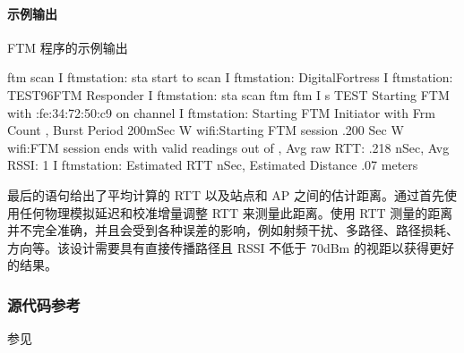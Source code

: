 \documentclass[a4paper,12pt,english]{sphinxmanual}
\begin{document}
{{\begin{enumerate}
\end{enumerate}


\paragraph{示例输出}
\label{\detokenize{exp-esp32/wifi/ftm:id5}}
\sphinxAtStartPar
FTM 程序的示例输出 \sphinxhyphen{}

\begin{sphinxVerbatim}[commandchars=\\\{\}]
ftm\PYGZgt{} scan
I  ftm\PYGZus{}station: sta start to scan
I  ftm\PYGZus{}station: \PYG{o}{[}DigitalFortress\PYG{o}{]}\PYG{o}{[}\PYG{o}{]}
I  ftm\PYGZus{}station: \PYG{o}{[}TEST\PYG{o}{]}\PYG{o}{[}\PYGZhy{}96\PYG{o}{]}\PYG{o}{[}FTM Responder\PYG{o}{]}
I  ftm\PYGZus{}station: sta scan 
ftm\PYGZgt{} ftm \PYGZhy{}I \PYGZhy{}s TEST
Starting FTM with :fe:34:72:50:c9 on channel 
I  ftm\PYGZus{}station: Starting FTM Initiator with Frm Count , Burst Period \PYGZhy{} 200mSec
W  wifi:Starting FTM session  .200 Sec
W  wifi:FTM session ends with  valid readings out of , Avg raw RTT: .218 nSec, Avg RSSI: \PYGZhy{}1
I  ftm\PYGZus{}station: Estimated RTT \PYGZhy{}  nSec, Estimated Distance \PYGZhy{} .07 meters
\end{sphinxVerbatim}

\sphinxAtStartPar
最后的语句给出了平均计算的 RTT 以及站点和 AP 之间的估计距离。通过首先使用任何物理模拟延迟和校准增量调整 RTT 来测量此距离。使用 RTT 测量的距离并不完全准确，并且会受到各种误差的影响，例如射频干扰、多路径、路径损耗、方向等。该设计需要具有直接传播路径且 RSSI 不低于 \sphinxhyphen{}70dBm 的视距以获得更好的结果。


\subsubsection{源代码参考}
\label{\detokenize{exp-esp32/wifi/ftm:id6}}
\sphinxAtStartPar
参见{\hyperref[\detokenize{reference::doc}]{}}

}}
\end{document}
